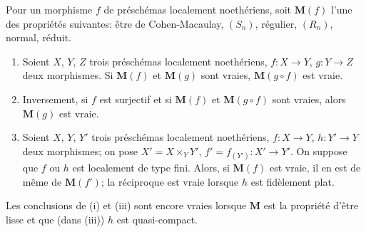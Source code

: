 \begin{proposition}[6.8.3]
\label{IV.2.s6.8.3-fr}
Pour un morphisme $f$ de préschémas localement noethériens, soit $\boldsymbol{M}(f)$
l'une des propriétés suivantes: être de Cohen-Macaulay, $(S_n)$, régulier,
$(R_n)$, normal, réduit.
\begin{enumerate}
\item[\textup{(i)}] Soient $X$, $Y$, $Z$ trois préschémas localement noethériens,
$f:X\to Y$, $g:Y\to Z$ deux morphismes. Si $\boldsymbol{M}(f)$ et $\boldsymbol{M}(g)$ sont vraies,
$\boldsymbol{M}(g\circ f)$ est vraie.
\item[\textup{(ii)}] Inversement, si $f$ est surjectif et si $\boldsymbol{M}(f)$ et $\boldsymbol{M}(g\circ f)$
sont vraies, alors $\boldsymbol{M}(g)$ est vraie.
\item[\textup{(iii)}] Soient $X$, $Y$, $Y'$ trois préschémas localement noethériens,
$f:X\to Y$, $h:Y'\to Y$ deux morphismes; on pose $X'=X\times_Y Y'$,
$f'=f_{(Y')}:X'\to Y'$. On suppose que $f$ ou $h$ est localement de type
fini. Alors, si $\boldsymbol{M}(f)$ est vraie, il en est de même de $\boldsymbol{M}(f')$; la réciproque
est vraie lorsque $h$ est fidèlement plat.
\end{enumerate}

Les conclusions de \textup{(i)} et \textup{(iii)} sont encore vraies lorsque $\boldsymbol{M}$ est la propriété
d'être lisse et que (dans \textup{(iii)}) $h$ est quasi-compact.
\end{proposition}

